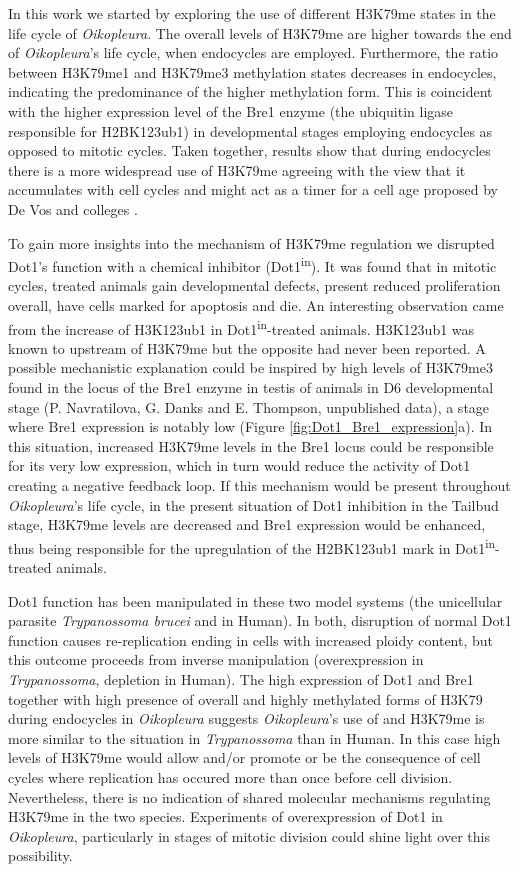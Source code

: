 \documentclass[11pt,twoside,a4paper]{report}
\begin{document}
In this work we started by exploring the use of different H3K79me states in the life cycle of \textit{Oikopleura}. The overall levels of H3K79me are higher towards the end of \textit{Oikopleura}'s life cycle, when endocycles are employed. Furthermore, the ratio between H3K79me1 and H3K79me3 methylation states decreases in endocycles, indicating the predominance of the higher methylation form. This is coincident with the higher expression level of the Bre1 enzyme (the ubiquitin ligase responsible for H2BK123ub1) in developmental stages employing endocycles as opposed to mitotic cycles. Taken together, results show that during endocycles there is a more widespread use of H3K79me agreeing with the view that it accumulates with cell cycles and might act as a timer for a cell age proposed by De Vos and colleges \cite{DeVos2011}.

To gain more insights into the mechanism of H3K79me regulation we disrupted Dot1's function with a chemical inhibitor (Dot1\textsuperscript{in}). It was found that in mitotic cycles, treated animals gain developmental defects, present reduced proliferation overall, have cells marked for apoptosis and die. An interesting observation came from the increase of H3K123ub1 in Dot1\textsuperscript{in}-treated animals. H3K123ub1 was known to upstream of H3K79me but the opposite had never been reported. A possible mechanistic explanation could be inspired by high levels of H3K79me3 found in the locus of the Bre1 enzyme in testis of animals in D6 developmental stage (P. Navratilova, G. Danks and E. Thompson, unpublished data), a stage where Bre1 expression is notably low (Figure \ref{fig:Dot1_Bre1_expression}a). In this situation, increased H3K79me levels in the Bre1 locus could be responsible for its very low expression, which in turn would reduce the activity of Dot1 creating a negative feedback loop. If this mechanism would be present throughout \textit{Oikopleura}'s life cycle, in the present situation of Dot1 inhibition in the Tailbud stage, H3K79me levels are decreased and Bre1 expression would be enhanced, thus being responsible for the upregulation of the H2BK123ub1 mark in Dot1\textsuperscript{in}-treated animals.

Dot1 function has been manipulated in these two model systems (the unicellular parasite \textit{Trypanossoma brucei} and in Human). In both, disruption of normal Dot1 function causes re-replication ending in cells with increased ploidy content, but this outcome proceeds from inverse manipulation (overexpression in \textit{Trypanossoma}, depletion in Human). The high expression of Dot1 and Bre1 together with high presence of overall and highly methylated forms of H3K79 during endocycles in \textit{Oikopleura} suggests \textit{Oikopleura}'s use of and H3K79me is more similar to the situation in \textit{Trypanossoma} than in Human. In this case high levels of H3K79me would allow and/or promote or be the consequence of cell cycles where replication has occured more than once before cell division. Nevertheless, there is no indication of shared molecular mechanisms regulating H3K79me in the two species. Experiments of overexpression of Dot1 in \textit{Oikopleura}, particularly in stages of mitotic division could shine light over this possibility.
\end{document}
